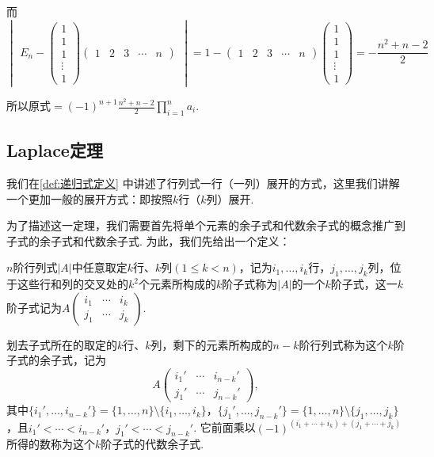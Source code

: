 \begin{solution}
    而 \[ \begin{vmatrix}E_n-\begin{pmatrix}
                1 \\1\\1\\\vdots\\1
            \end{pmatrix}\begin{pmatrix}1 & 2 & 3 & \cdots & n\end{pmatrix}\end{vmatrix}
        =1-\begin{pmatrix}1 & 2 & 3 & \cdots & n\end{pmatrix}
        \begin{pmatrix}1 \\ 1 \\ 1 \\ \vdots \\ 1\end{pmatrix}
        =-\frac{n^2+n-2}{2} \]

    所以原式$\displaystyle =(-1)^{n+1}\frac{n^2+n-2}{2}\prod_{i=1}^na_i$.
\end{solution}

\subsection{Laplace定理}
我们在\autoref{def:递归式定义} 中讲述了行列式一行（一列）展开的方式，这里我们讲解一个更加一般的展开方式：即按照$k$行（$k$列）展开.

为了描述这一定理，我们需要首先将单个元素的余子式和代数余子式的概念推广到子式的余子式和代数余子式. 为此，我们先给出一个定义：
\begin{definition}{}{}
    $n$阶行列式$|A|$中任意取定$k$行、$k$列$(1\leqslant k<n)$，记为$i_1,\ldots,i_k$行，$j_1,\ldots,j_k$列，位于这些行和列的交叉处的$k^2$个元素所构成的$k$阶子式称为$|A|$的一个$k$阶子式，这一$k$阶子式记为$A\begin{pmatrix}
            i_1 & \cdots & i_k \\
            j_1 & \cdots & j_k
        \end{pmatrix}$.

    划去子式所在的取定的$k$行、$k$列，剩下的元素所构成的$n-k$阶行列式称为这个$k$阶子式的余子式，记为
    \[A\begin{pmatrix}
            i_1' & \cdots & i_{n-k}' \\
            j_1' & \cdots & j_{n-k}'
        \end{pmatrix},\]
    其中$\{i_1',\ldots,i_{n-k}'\}=\{1,\ldots,n\}\setminus\{i_1,\ldots,i_k\}$，$\{j_1',\ldots,j_{n-k}'\}=\{1,\ldots,n\}\setminus\{j_1,\ldots,j_k\}$，且$i_1'<\cdots<i_{n-k}'$，$j_1'<\cdots<j_{n-k}'$. 它前面乘以$(-1)^{(i_1+\cdots+i_k)+(j_1+\cdots+j_k)}$所得的数称为这个$k$阶子式的代数余子式.
\end{definition}

